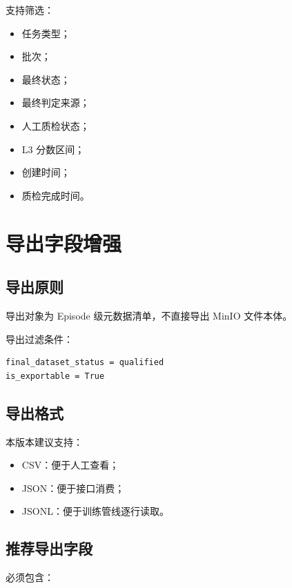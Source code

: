 \documentclass[UTF8,12pt,a4paper]{ctexart}
\begin{document}
支持筛选：

\begin{itemize}
  \item 任务类型；
  \item 批次；
  \item 最终状态；
  \item 最终判定来源；
  \item 人工质检状态；
  \item L3 分数区间；
  \item 创建时间；
  \item 质检完成时间。
\end{itemize}

\section{导出字段增强}

\subsection{导出原则}

导出对象为 Episode 级元数据清单，不直接导出 MinIO 文件本体。

导出过滤条件：

\begin{lstlisting}
final_dataset_status = qualified
is_exportable = True
\end{lstlisting}

\subsection{导出格式}

本版本建议支持：

\begin{itemize}
  \item CSV：便于人工查看；
  \item JSON：便于接口消费；
  \item JSONL：便于训练管线逐行读取。
\end{itemize}

\subsection{推荐导出字段}

必须包含：
\end{document}
